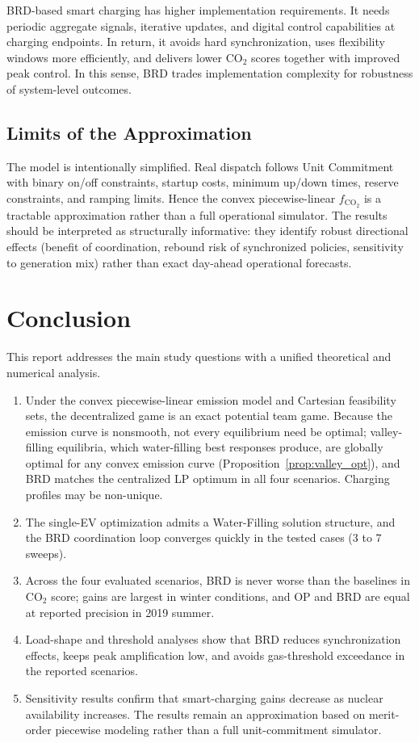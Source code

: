 \documentclass[11pt]{article}
\begin{document}
BRD-based smart charging has higher implementation requirements. It needs periodic aggregate signals, iterative updates, and digital control capabilities at charging endpoints. In return, it avoids hard synchronization, uses flexibility windows more efficiently, and delivers lower CO$_2$ scores together with improved peak control. In this sense, BRD trades implementation complexity for robustness of system-level outcomes.

\subsection{Limits of the Approximation}
\label{subsec:model_limitations}

The model is intentionally simplified. Real dispatch follows Unit Commitment with binary on/off constraints, startup costs, minimum up/down times, reserve constraints, and ramping limits. Hence the convex piecewise-linear $f_{\mathrm{CO}_2}$ is a tractable approximation rather than a full operational simulator. The results should be interpreted as structurally informative: they identify robust directional effects (benefit of coordination, rebound risk of synchronized policies, sensitivity to generation mix) rather than exact day-ahead operational forecasts.

\section{Conclusion}
\label{sec:conclusion}

This report addresses the main study questions with a unified theoretical and numerical analysis.
\begin{enumerate}
\item Under the convex piecewise-linear emission model and Cartesian feasibility sets, the decentralized game is an exact potential team game. Because the emission curve is nonsmooth, not every equilibrium need be optimal; valley-filling equilibria, which water-filling best responses produce, are globally optimal for any convex emission curve (Proposition~\ref{prop:valley_opt}), and BRD matches the centralized LP optimum in all four scenarios. Charging profiles may be non-unique.
\item The single-EV optimization admits a Water-Filling solution structure, and the BRD coordination loop converges quickly in the tested cases (3 to 7 sweeps).
\item Across the four evaluated scenarios, BRD is never worse than the baselines in CO$_2$ score; gains are largest in winter conditions, and OP and BRD are equal at reported precision in 2019 summer.
\item Load-shape and threshold analyses show that BRD reduces synchronization effects, keeps peak amplification low, and avoids gas-threshold exceedance in the reported scenarios.
\item Sensitivity results confirm that smart-charging gains decrease as nuclear availability increases. The results remain an approximation based on merit-order piecewise modeling rather than a full unit-commitment simulator.
\end{enumerate}
\end{document}
